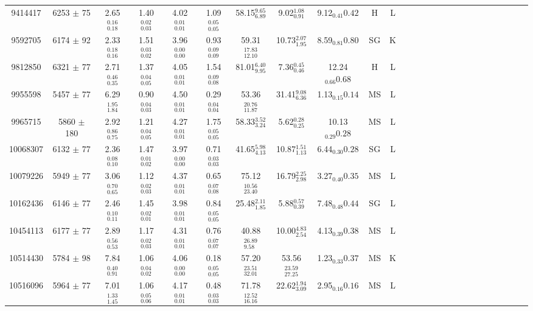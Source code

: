 \begin{table}
\begin{tabular}{cccccccccccccccccccccccccc}
9414417  & 6253 $\pm$ 75 & 2.65$_{0.18}^{0.16}$ & 1.40$_{0.03}^{0.02}$ & 4.02$_{0.01}^{0.01}$ & 1.09$_{0.05}^{0.05}$ & 58.15$_{6.89}^{9.65}$ & 9.02$_{0.91}^{1.08}$ & 9.12$_{0.41}{0.42}$ & H & L \\
9592705  & 6174 $\pm$ 92 & 2.33$_{0.16}^{0.18}$ & 1.51$_{0.02}^{0.03}$ & 3.96$_{0.00}^{0.00}$ & 0.93$_{0.09}^{0.09}$ & 59.31$_{12.10}^{17.83}$ & 10.73$_{1.95}^{2.07}$ & 8.59$_{0.81}{0.80}$ & SG & K \\
9812850  & 6321 $\pm$ 77 & 2.71$_{0.35}^{0.46}$ & 1.37$_{0.05}^{0.04}$ & 4.05$_{0.01}^{0.01}$ & 1.54$_{0.08}^{0.09}$ & 81.01$_{9.95}^{6.40}$ & 7.36$_{0.46}^{0.45}$ & 12.24$_{0.66}{0.68}$ & H & L \\
9955598  & 5457 $\pm$ 77 & 6.29$_{1.84}^{1.95}$ & 0.90$_{0.03}^{0.04}$ & 4.50$_{0.01}^{0.01}$ & 0.29$_{0.04}^{0.04}$ & 53.36$_{11.87}^{20.76}$ & 31.41$_{6.36}^{9.08}$ & 1.13$_{0.15}{0.14}$ & MS & L \\
9965715  & 5860 $\pm$ 180 & 2.92$_{0.75}^{0.86}$ & 1.21$_{0.05}^{0.04}$ & 4.27$_{0.01}^{0.01}$ & 1.75$_{0.05}^{0.05}$ & 58.33$_{3.24}^{3.52}$ & 5.62$_{0.25}^{0.28}$ & 10.13$_{0.29}{0.28}$ & MS & L \\
10068307 & 6132 $\pm$ 77 & 2.36$_{0.10}^{0.08}$ & 1.47$_{0.02}^{0.01}$ & 3.97$_{0.00}^{0.00}$ & 0.71$_{0.03}^{0.03}$ & 41.65$_{4.13}^{5.98}$ & 10.87$_{1.13}^{1.51}$ & 6.44$_{0.30}{0.28}$ & SG & L \\
10079226 & 5949 $\pm$ 77 & 3.06$_{0.65}^{0.70}$ & 1.12$_{0.03}^{0.02}$ & 4.37$_{0.01}^{0.01}$ & 0.65$_{0.08}^{0.07}$ & 75.12$_{23.40}^{10.56}$ & 16.79$_{2.98}^{2.25}$ & 3.27$_{0.40}{0.35}$ & MS & L \\
10162436 & 6146 $\pm$ 77 & 2.46$_{0.11}^{0.10}$ & 1.45$_{0.01}^{0.02}$ & 3.98$_{0.01}^{0.01}$ & 0.84$_{0.05}^{0.05}$ & 25.48$_{1.85}^{2.11}$ & 5.88$_{0.39}^{0.57}$ & 7.48$_{0.48}{0.44}$ & SG & L \\
10454113 & 6177 $\pm$ 77 & 2.89$_{0.53}^{0.56}$ & 1.17$_{0.03}^{0.02}$ & 4.31$_{0.01}^{0.01}$ & 0.76$_{0.07}^{0.07}$ & 40.88$_{9.58}^{26.89}$ & 10.00$_{2.54}^{4.83}$ & 4.13$_{0.39}{0.38}$ & MS & L \\
10514430 & 5784 $\pm$ 98 & 7.84$_{0.91}^{0.40}$ & 1.06$_{0.02}^{0.04}$ & 4.06$_{0.00}^{0.00}$ & 0.18$_{0.05}^{0.05}$ & 57.20$_{32.01}^{23.51}$ & 53.56$_{27.25}^{23.59}$ & 1.23$_{0.33}{0.37}$ & MS & K \\
10516096 & 5964 $\pm$ 77 & 7.01$_{1.45}^{1.33}$ & 1.06$_{0.06}^{0.05}$ & 4.17$_{0.01}^{0.01}$ & 0.48$_{0.03}^{0.03}$ & 71.78$_{16.16}^{12.52}$ & 22.62$_{3.09}^{1.94}$ & 2.95$_{0.16}{0.16}$ & MS & L \\

\end{tabular}
\end{table}
